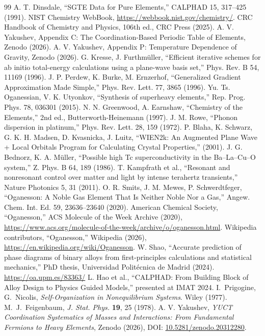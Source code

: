 \documentclass[12pt,a4paper]{article}
\begin{document}
	\begin{thebibliography}{99}
		 A. T. Dinsdale, ``SGTE Data for Pure Elements,'' CALPHAD 15, 317–425 (1991).
		 NIST Chemistry WebBook, \url{https://webbook.nist.gov/chemistry/}.
		 CRC Handbook of Chemistry and Physics, 106th ed., CRC Press (2025).
		 A. V. Yakushev, Appendix C: The Coordination-Based Periodic Table of Elements, Zenodo (2026).
		 A. V. Yakushev, Appendix P: Temperature Dependence of Gravity, Zenodo (2026).
		 G. Kresse, J. Furthmüller, ``Efficient iterative schemes for ab initio total-energy calculations using a plane-wave basis set,'' Phys. Rev. B 54, 11169 (1996).
		 J. P. Perdew, K. Burke, M. Ernzerhof, ``Generalized Gradient Approximation Made Simple,'' Phys. Rev. Lett. 77, 3865 (1996).
		 Yu. Ts. Oganessian, V. K. Utyonkov, ``Synthesis of superheavy elements,'' Rep. Prog. Phys. 78, 036301 (2015).
		 N. N. Greenwood, A. Earnshaw, ``Chemistry of the Elements,'' 2nd ed., Butterworth-Heinemann (1997).
		 J. M. Rowe, ``Phonon dispersion in platinum,'' Phys. Rev. Lett. 28, 159 (1972).
		 P. Blaha, K. Schwarz, G. K. H. Madsen, D. Kvasnicka, J. Luitz, ``WIEN2k: An Augmented Plane Wave + Local Orbitals Program for Calculating Crystal Properties,'' (2001).
		 J. G. Bednorz, K. A. Müller, ``Possible high Tc superconductivity in the Ba–La–Cu–O system,'' Z. Phys. B 64, 189 (1986).
		 T. Kampfrath et al., ``Resonant and nonresonant control over matter and light by intense terahertz transients,'' Nature Photonics 5, 31 (2011).
		 O. R. Smits, J. M. Mewes, P. Schwerdtfeger, ``Oganesson: A Noble Gas Element That Is Neither Noble Nor a Gas,'' Angew. Chem. Int. Ed. 59, 23636–23640 (2020).
		 American Chemical Society, ``Oganesson,'' ACS Molecule of the Week Archive (2020), \url{https://www.acs.org/molecule-of-the-week/archive/o/oganesson.html}.
		 Wikipedia contributors, ``Oganesson,'' Wikipedia (2026), \url{https://en.wikipedia.org/wiki/Oganesson}.
		 W. Shao, ``Accurate prediction of phase diagrams of binary alloys from first-principles calculations and statistical mechanics,'' PhD thesis, Universidad Politécnica de Madrid (2024). \url{https://oa.upm.es/83363/}
		 L. Hao et al., ``CALPHAD: From Building Block of Alloy Design to Physics Guided Models,'' presented at IMAT 2024.
		 I.~Prigogine, G.~Nicolis, \emph{Self-Organization in Nonequilibrium Systems}. Wiley (1977).
		 M.~J.~Feigenbaum, \emph{J. Stat. Phys.} \textbf{19}, 25 (1978).
		 A. V. Yakushev, \emph{YUCT Coordination Systematics of Masses and Interactions: From Fundamental Fermions to Heavy Elements}, Zenodo (2026), DOI: \href{https://doi.org/10.5281/zenodo.20312280}{10.5281/zenodo.20312280}.
	\end{thebibliography}
	
\end{document}
